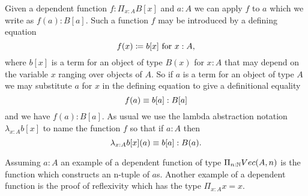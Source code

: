 Given a dependent function $f : \Pi_{x:A}B[x]$ and $a : A$ we can
apply $f$ to $a$ which we write as $f(a) : B[a]$.  Such a function $f$ may be introduced by a defining equation
  \[ f(x)\coloneqq b[x]\mbox{ for } x:A,\]
where $b[x]$ is a term for an object of type $B(x)$ for $x:A$ that may depend on the variable $x$ ranging over objects of $A$.  So if $a$ is a term for an object of type $A$ we may substitute $a$ for $x$ in the defining equation to give a definitional equality
  \[ f(a)\equiv b[a]:B[a]\]
and we have $f(a):B[a]$.  As usual we use the lambda abstraction notation 
$\lambda_{x:A}b[x]$ to name the function $f$ so that if $a:A$ then
  \[\lambda_{x:A}b[x](a)\equiv b[a]: B(a).\]

Assuming $a:A$ an example of a dependent function of type $\Pi_{n:\mathbb{N}}Vec(A,n)$
is the function which constructs an n-tuple of $a$s. Another example
of a dependent function is the proof of reflexivity which has the type
$\Pi_{x:A}x = x$.









